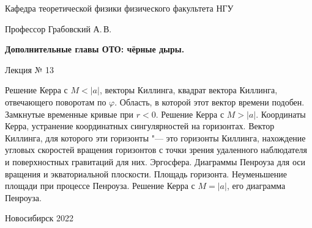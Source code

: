 \documentclass[12pt,pagesize,paper=192mm:108mm,landscape]{scrbook}
\begin{document}
\begin{titlepage}
\begin{center}
    Кафедра теоретической физики физического факультета НГУ
    \medskip

    \Large
    Профессор Грабовский А.\,В.
    \smallskip

    \Large
    \textbf{Дополнительные главы ОТО: чёрные дыры.}
    \smallskip

    \Large
    Лекция № 13
    \vfill

    \normalsize
    \begin{minipage}{0.9\linewidth}
      Решение Керра с $M < |a|$, векторы Киллинга, квадрат вектора
      Киллинга, отвечающего поворотам по $\varphi$. Область, в которой
      этот вектор времени подобен. Замкнутые временные кривые при
      $r<0$. Решение Керра с $M > |a|$. Координаты Керра, устранение
      координатных сингулярностей на горизонтах. Вектор Киллинга, для
      которого эти горизонты "--- это горизонты Киллинга, нахождение
      угловых скоростей вращения горизонтов с точки зрения удаленного
      наблюдателя и поверхностных гравитаций для
      них. Эргосфера. Диаграммы Пенроуза для оси вращения и
      экваториальной плоскости. Площадь горизонта. Неуменьшение
      площади при процессе Пенроуза. Решение Керра с $M = |a|$, его
      диаграмма Пенроуза.
    \end{minipage}
    \vfill

    \normalsize \ccbysa\hspace{0.5em}  Новосибирск 2022
  \end{center}
\end{titlepage}
\end{document}
